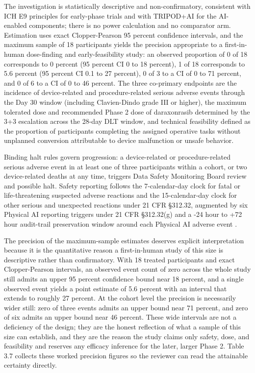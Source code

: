 The investigation is statistically descriptive and non-confirmatory, consistent with
ICH E9 principles for early-phase trials and with TRIPOD+AI for the AI-enabled
components; there is no power calculation and no comparator arm. Estimation uses
exact Clopper-Pearson 95 percent confidence intervals, and the maximum sample of 18
participants yields the precision appropriate to a first-in-human dose-finding and
early-feasibility study: an observed proportion of 0 of 18 corresponds to 0 percent
(95 percent CI 0 to 18 percent), 1 of 18 corresponds to 5.6 percent (95 percent CI
0.1 to 27 percent), 0 of 3 to a CI of 0 to 71 percent, and 0 of 6 to a CI of 0 to 46
percent. The three co-primary endpoints are the incidence of device-related and
procedure-related serious adverse events through the Day 30 window (including
Clavien-Dindo grade III or higher), the maximum tolerated dose and recommended Phase
2 dose of daraxonrasib determined by the 3+3 escalation across the 28-day DLT window,
and technical feasibility defined as the proportion of participants completing the
assigned operative tasks without unplanned conversion attributable to device
malfunction or unsafe behavior. 

Binding halt rules govern progression: a
device-related or procedure-related serious adverse event in at least one of three
participants within a cohort, or two device-related deaths at any time, triggers Data
Safety Monitoring Board review and possible halt. Safety reporting follows the
7-calendar-day clock for fatal or life-threatening suspected adverse reactions and
the 15-calendar-day clock for other serious and unexpected reactions under 21 CFR
\S 312.32, augmented by six Physical AI reporting triggers under 21 CFR \S 312.32(g)
and a -24 hour to +72 hour audit-trail preservation window around each Physical AI
adverse event \cite{phase1guidance, cfr312paiuni}.

The precision of the maximum-sample estimates deserves explicit interpretation
because it is the quantitative reason a first-in-human study of this size is
descriptive rather than confirmatory. With 18 treated participants and exact
Clopper-Pearson intervals, an observed event count of zero across the whole study
still admits an upper 95 percent confidence bound near 18 percent, and a single
observed event yields a point estimate of 5.6 percent with an interval that extends
to roughly 27 percent. At the cohort level the precision is necessarily wider still:
zero of three events admits an upper bound near 71 percent, and zero of six admits an
upper bound near 46 percent. These wide intervals are not a deficiency of the design;
they are the honest reflection of what a sample of this size can establish, and they
are the reason the study claims only safety, dose, and feasibility and reserves any
efficacy inference for the later, larger Phase 2. Table 3.7 collects these worked
precision figures so the reviewer can read the attainable certainty directly.

